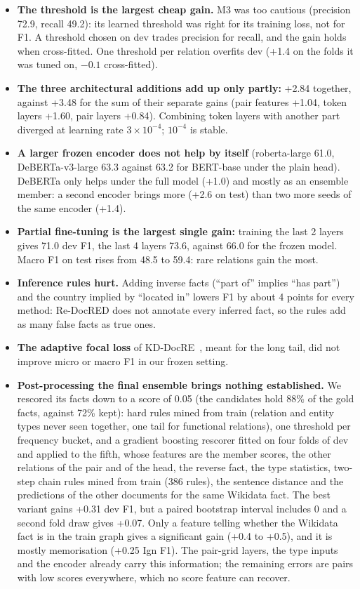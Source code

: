 \documentclass[pdflatex,sn-mathphys-num]{sn-jnl}
\begin{document}
\begin{itemize}
\item \textbf{The threshold is the largest cheap gain.} M3 was too cautious (precision 72.9, recall 49.2): its learned threshold was right for its training loss, not for F1. A threshold chosen on dev trades precision for recall, and the gain holds when cross-fitted. One threshold per relation overfits dev (+1.4 on the folds it was tuned on, $-0.1$ cross-fitted).
\item \textbf{The three architectural additions add up only partly:} +2.84 together, against +3.48 for the sum of their separate gains (pair features +1.04, token layers +1.60, pair layers +0.84). Combining token layers with another part diverged at learning rate $3\times10^{-4}$; $10^{-4}$ is stable.
\item \textbf{A larger frozen encoder does not help by itself} (roberta-large 61.0, DeBERTa-v3-large 63.3 against 63.2 for BERT-base under the plain head). DeBERTa only helps under the full model (+1.0) and mostly as an ensemble member: a second encoder brings more (+2.6 on test) than two more seeds of the same encoder (+1.4).
\item \textbf{Partial fine-tuning is the largest single gain:} training the last 2 layers gives 71.0 dev F1, the last 4 layers 73.6, against 66.0 for the frozen model. Macro F1 on test rises from 48.5 to 59.4: rare relations gain the most.
\item \textbf{Inference rules hurt.} Adding inverse facts (``part of'' implies ``has part'') and the country implied by ``located in'' lowers F1 by about 4 points for every method: Re-DocRED does not annotate every inferred fact, so the rules add as many false facts as true ones.
\item \textbf{The adaptive focal loss} of KD-DocRE~\cite{tan2022kddocre}, meant for the long tail, did not improve micro or macro F1 in our frozen setting.
\item \textbf{Post-processing the final ensemble brings nothing established.} We rescored its facts down to a score of 0.05 (the candidates hold 88\% of the gold facts, against 72\% kept): hard rules mined from train (relation and entity types never seen together, one tail for functional relations), one threshold per frequency bucket, and a gradient boosting rescorer fitted on four folds of dev and applied to the fifth, whose features are the member scores, the other relations of the pair and of the head, the reverse fact, the type statistics, two-step chain rules mined from train (386 rules), the sentence distance and the predictions of the other documents for the same Wikidata fact. The best variant gains +0.31 dev F1, but a paired bootstrap interval includes 0 and a second fold draw gives +0.07. Only a feature telling whether the Wikidata fact is in the train graph gives a significant gain (+0.4 to +0.5), and it is mostly memorisation (+0.25 Ign F1). The pair-grid layers, the type inputs and the encoder already carry this information; the remaining errors are pairs with low scores everywhere, which no score feature can recover.
\end{itemize}
\end{document}
